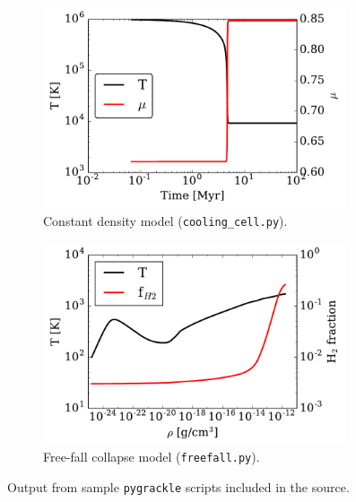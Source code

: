 \begin{figure}
\centering
\begin{subfigure}{.48\textwidth}
  \centering
  \includegraphics[width=0.98\textwidth]{figures/cooling_cell.pdf}
  \caption{Constant density model (\texttt{cooling\_cell.py}).}
  \label{fig:cooling-cell}
\end{subfigure}%
\begin{subfigure}{.48\textwidth}
  \centering
  \includegraphics[width=0.98\textwidth]{figures/freefall.pdf}
  \caption{Free-fall collapse model (\texttt{freefall.py}).}
  \label{fig:freefall}
\end{subfigure}%
\vspace*{-0.5\baselineskip}
\caption{Output from sample \texttt{pygrackle} scripts included in the \grackle{}
  source.}
\label{fig:evolve}
\vspace*{-1\baselineskip}
\end{figure}

